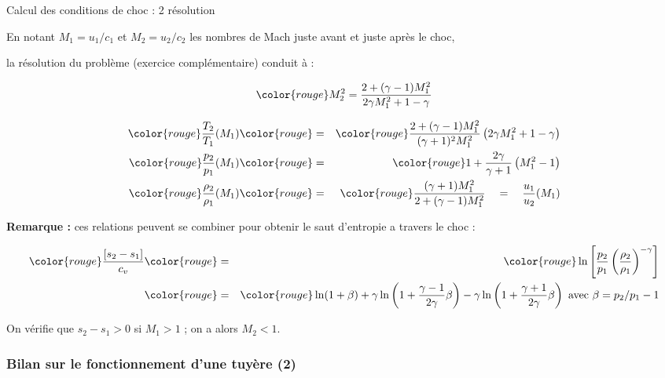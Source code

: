 \begin{frame}{Calcul des conditions de choc : 2 résolution}
\small

En notant $M_1 = u_1/c_1$ et $M_2 = u_2/c_2$ les nombres de Mach juste avant et juste après le choc,

la résolution du problème (exercice complémentaire) conduit à :

\begin{equation}
	\color{rouge}
	M_2^2 = \frac{2+(\gamma-1)M_1^2}{2\gamma M_1^2 +1-\gamma}
\end{equation}


\begin{eqnarray}
	\color{rouge} \frac{T_2}{T_1}(M_1) 
	& 
	\color{rouge} = 
	& 
	\color{rouge} \frac{2 + (\gamma-1)M_1^2}{(\gamma+1)^2M_1^2}\left ( 2\gamma M_1^2 + 1 -\gamma\right )
	\\
	\color{rouge} \frac{p_2}{p_1}(M_1) 
	& 
	\color{rouge} = 
	& 
	\color{rouge} 1 + \frac{2\gamma}{\gamma+1}\left ( M_1^2 - 1\right )
	\\
	\color{rouge} \frac{\rho_2}{\rho_1} (M_1) 
	& 
	\color{rouge} = 
	& 
	\color{rouge} \frac{(\gamma+1) M_1^2}{2+(\gamma-1)M_1^2} \quad = \quad \frac{u_1}{u_2}(M_1)
	\end{eqnarray}


{\bf Remarque : } ces relations peuvent se combiner pour obtenir le saut d'entropie a travers le choc :

\begin{eqnarray}
\color{rouge} \frac{\left[ s_2- s_1  \right]}{c_v}
& \color{rouge} = 
&
	\color{rouge}  \ln \left[ \frac{p_2}{p_1} \left( \frac{\rho_2}{\rho_1}\right)^{-\gamma} \right]
	\\
& \color{rouge} = & \color{rouge} \ln (1 + \beta) + \gamma \ln \left( 1+\frac{\gamma-1}{2 \gamma} \beta \right) 
- \gamma \ln \left( 1+\frac{\gamma+1}{2 \gamma} \beta \right)
\mbox{ avec } \beta = p_2/p_1-1 \nonumber
	\end{eqnarray}

On vérifie que $s_2-s_1>0$ si $M_1>1$ ; on a alors $M_2<1$. 

\end{frame}



\subsubsection{Bilan sur le fonctionnement d'une tuyère (2)}

